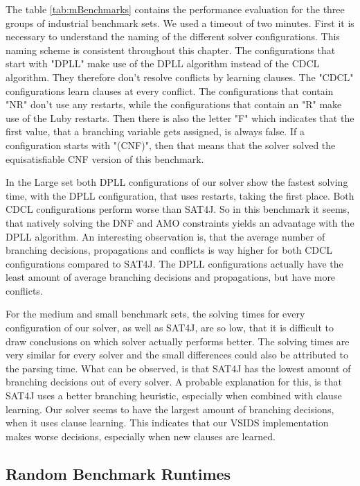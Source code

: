 \documentclass{easychair}
\begin{document}
The table \ref{tab:mBenchmarks} contains the performance evaluation for the three groups of industrial benchmark sets. We used a timeout of two minutes. First it is necessary to understand the naming of the different solver configurations. This naming scheme is consistent throughout this chapter. The configurations that start with "DPLL" make use of the DPLL algorithm instead of the CDCL algorithm. They therefore don't resolve conflicts by learning clauses. The "CDCL" configurations learn clauses at every conflict. The configurations that contain "NR" don't use any restarts, while the configurations that contain an "R" make use of the Luby restarts. Then there is also the letter "F" which indicates that the first value, that a branching variable gets assigned, is always false. If a configuration starts with "(CNF)", then that means that the solver solved the equisatisfiable CNF version of this benchmark.

In the Large set both DPLL configurations of our solver show the fastest solving time, with the DPLL configuration, that uses restarts, taking the first place. Both CDCL configurations perform worse than SAT4J. So in this benchmark it seems, that natively solving the DNF and AMO constraints yields an advantage with the DPLL algorithm. An interesting observation is, that the average number of branching decisions, propagations and conflicts is way higher for both CDCL configurations compared to SAT4J. The DPLL configurations actually have the least amount of average branching decisions and propagations, but have more conflicts.

For the medium and small benchmark sets, the solving times for every configuration of our solver, as well as SAT4J, are so low, that it is difficult to draw conclusions on which solver actually performs better. The solving times are very similar for every solver and the small differences could also be attributed to the parsing time. What can be observed, is that SAT4J has the lowest amount of branching decisions out of every solver.
A probable explanation for this, is that SAT4J uses a better branching heuristic, especially when combined with clause learning. Our solver seems to have the largest amount of branching decisions, when it uses clause learning. This indicates that our VSIDS implementation makes worse decisions, especially when new clauses are learned.

\subsection{Random Benchmark Runtimes}
\end{document}
